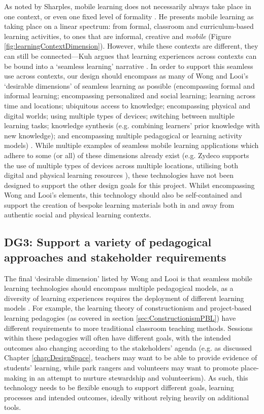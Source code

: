As noted by Sharples, mobile learning does not necessarily always take place in one context, or even one fixed level of formality \citep{Sharples2013}. He presents mobile learning as taking place on a linear spectrum: from formal, classroom and curriculum-based learning activities, to ones that are informal, creative and \textit{mobile} (Figure \ref{fig:learningContextDimension}). However, while these contexts are different, they can still be connected---Kuh argues that learning experiences across contexts can be bound into a `seamless learning' narrative \citep{Kuh1996}. In order to support this seamless use across contexts, our design should encompass as many of Wong and Looi's `desirable dimensions' of seamless learning as possible (encompassing formal and informal learning; encompassing personalized and social learning; learning across time and locations; ubiquitous access to knowledge; encompassing physical and digital worlds; using multiple types of devices; switching between multiple learning tasks; knowledge synthesis (e.g. combining learners’ prior knowledge with new knowledge); and encompassing multiple pedagogical or learning activity models) \citep{Wong2011}. While multiple examples of seamless mobile learning applications which adhere to some (or all) of these dimensions already exist (e.g. Zydeco supports the use of multiple types of devices across multiple locations, utilising both digital and physical learning resources \citep{kuhn2011}), these technologies have not been designed to support the other design goals for this project. Whilst encompassing Wong and Looi's elements, this technology should also be self-contained and support the creation of bespoke learning materials both in and away from authentic social and physical learning contexts.

\subsection*{ DG3: Support a variety of pedagogical approaches and stakeholder requirements }
\label{DG3}

The final `desirable dimension' listed by Wong and Looi is that seamless mobile learning technologies should encompass multiple pedagogical models, as a diversity of learning experiences requires the deployment of different learning models \citep{Wong2011}. For example, the learning theory of constructionism and project-based learning pedagogies (as covered in section \ref{sec:ConstructionismPBL}) have different requirements to more traditional classroom teaching methods. Sessions within these pedagogies will often have different goals, with the intended outcomes also changing according to the stakeholders' agenda (e.g. as discussed Chapter \ref{chap:DesignSpace}, teachers may want to be able to provide evidence of students' learning, while park rangers and volunteers may want to promote place-making in an attempt to nurture stewardship and volunteerism). As such, this technology needs to be flexible enough to support different goals, learning processes and intended outcomes, ideally without relying heavily on additional tools.

